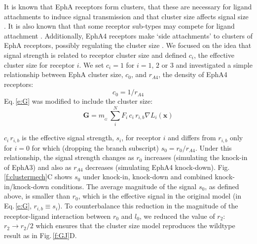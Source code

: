 \documentclass[9pt,lineno,draft]{elife}
\begin{document}
It is known that EphA receptors form clusters, that these are necessary for ligand attachments to induce signal transmission and that cluster size affects signal size \citep{nikolov_ephephrin_2013}. It is also known that that some receptor sub-types may compete for ligand attachment \citep{fiore_regulation_2019}.
Additionally, EphA4 receptors make `side attachments' to clusters of EphA receptors, possibly regulating the cluster size \citep{nikolov_ephephrin_2013}.
%
We focused on the idea that signal strength is related to receptor cluster size and defined $c_i$, the effective cluster size for receptor $i$.
We set $c_i=1$ for $i=1$, $2$ or $3$ and investigated a simple relationship between EphA cluster size, $c_0$, and $r_{\!\scriptscriptstyle A4}$, the density of EphA4 receptors:
\begin{equation}
    c_0 = 1/r_{\!\scriptscriptstyle A4}
\end{equation}
%
Eq.\,\ref{e:G} was modified to include the cluster size:
%
\begin{equation}\label{e:Gcs}
\mathbf{G} = m_{\!_G}\,\sum_i^N F_i\,c_i\,r_{i,b} \nabla L_i(\mathbf{x})
\end{equation}

$c_i\,r_{i,b}$ is the effective signal strength, $s_i$, for receptor $i$ and differs from $r_{i,b}$ only for $i=0$ for which (dropping the branch subscript) $s_0 = r_0/r_{\!\scriptscriptstyle A4}$.
Under this relationship, the signal strength changes as $r_0$ increases (simulating the knock-in of EphA3) and also as $r_{\!\scriptscriptstyle A4}$ decreases (simulating EphA4 knock-down).
Fig.\,\ref{f:clustermech}C shows $s_0$ under knock-in, knock-down and combined knock-in/knock-down conditions.
The average magnitude of the signal $s_0$, as defined above, is smaller than $r_0$, which is the effective signal in the original model (in Eq.\,\ref{e:G}, $r_{i,b} \equiv s_i$). To counterbalance this reduction in the magnitude of the receptor-ligand interaction between $r_0$ and $l_0$, we reduced the value of $r_2$: $r_2 \rightarrow r_2/2$ which ensures that the cluster size model reproduces the wildtype result as in Fig.\,\ref{f:GJ}D.
\end{document}
